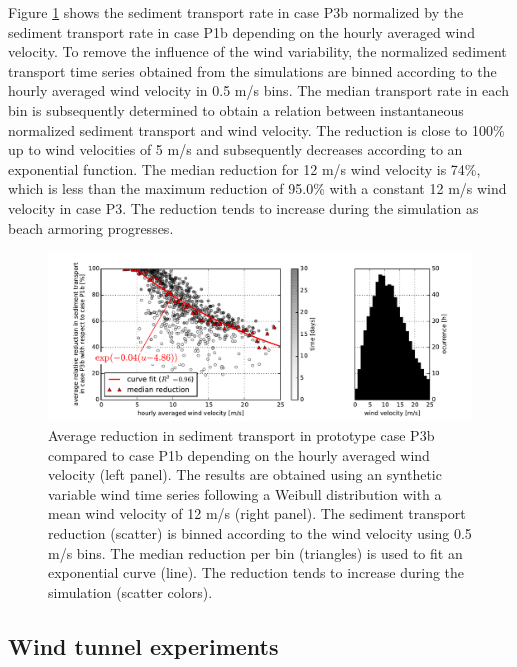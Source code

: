 Figure \ref{fig:variable_wind} shows the sediment transport rate in
case P3b normalized by the sediment transport rate in case P1b
depending on the hourly averaged wind velocity. To remove the
influence of the wind variability, the normalized sediment transport
time series obtained from the simulations are binned according to the
hourly averaged wind velocity in 0.5 m/s bins. The median transport
rate in each bin is subsequently determined to obtain a relation
between instantaneous normalized sediment transport and wind
velocity. The reduction is close to 100\% up to wind velocities of 5
m/s and subsequently decreases according to an exponential
function. The median reduction for 12 m/s wind velocity is 74\%, which
is less than the maximum reduction of 95.0\% with a constant 12 m/s
wind velocity in case P3. The reduction tends to increase during the
simulation as beach armoring progresses.

\begin{figure}
  \centering
  \includegraphics[width=\columnwidth]{../Figures/variable_wind_py}
  \caption{Average reduction in sediment transport in prototype case
    P3b compared to case P1b depending on the hourly averaged wind
    velocity (left panel). The results are obtained using an synthetic
    variable wind time series following a Weibull distribution with a
    mean wind velocity of 12 m/s (right panel). The sediment transport
    reduction (scatter) is binned according to the wind velocity using
    0.5 m/s bins. The median reduction per bin (triangles) is used to
    fit an exponential curve (line). The reduction tends to increase
    during the simulation (scatter colors).}
  \label{fig:variable_wind}
\end{figure}

\subsection{Wind tunnel experiments} \label{sec:windtunnel}

